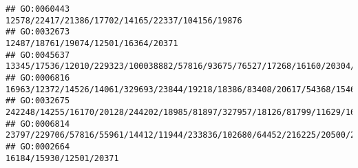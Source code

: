 \documentclass[
]{article}
\begin{document}
\begin{verbatim}
## GO:0060443                                                                                                                                                                                                                                                                                                                                                             12578/22417/21386/17702/14165/22337/104156/19876
## GO:0032673                                                                                                                                                                                                                                                                                                                                                                          12487/18761/19074/12501/16364/20371
## GO:0045637                                                                                                                                                                                                                                                                                                   13345/17536/12010/229323/100038882/57816/93675/76527/17268/16160/20304/20259/13386/21943/75766/15511/16149
## GO:0006816                                                                                                                                                                                                                                         16963/12372/14526/14061/329693/23844/19218/18386/83408/20617/54368/15465/16170/12478/81897/23832/246788/20307/20304/14169/22337/58226/24115/12482/14126/329064/12766
## GO:0032675                                                                                                                                                                                                                                                                                                                       242248/14255/16170/20128/244202/18985/81897/327957/18126/81799/11629/16149/20371/12229
## GO:0006814                                                                                                                                                                                                                                                                                           23797/229706/57816/55961/14412/11944/233836/102680/64452/216225/20500/218103/192113/14169/69354/30943/58226/329064
## GO:0002664                                                                                                                                                                                                                                                                                                                                                                                      16184/15930/12501/20371

\end{verbatim}
\end{document}
